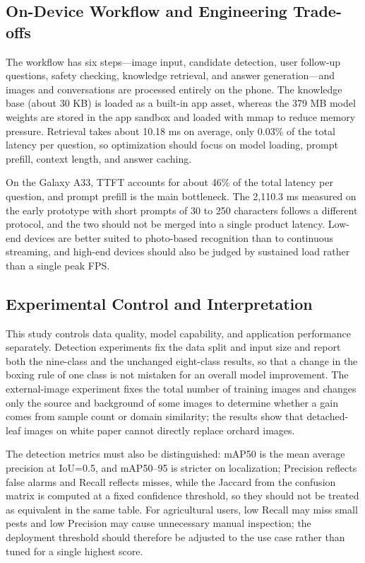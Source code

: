 \documentclass[10pt,twocolumn,a4paper]{article}
\begin{document}
\subsection{On-Device Workflow and Engineering Trade-offs}
The workflow has six steps—image input, candidate detection, user follow-up questions, safety checking, knowledge retrieval, and answer generation—and images and conversations are processed entirely on the phone. The knowledge base (about 30 KB) is loaded as a built-in app asset, whereas the 379 MB model weights are stored in the app sandbox and loaded with mmap to reduce memory pressure. Retrieval takes about 10.18 ms on average, only 0.03\% of the total latency per question, so optimization should focus on model loading, prompt prefill, context length, and answer caching.

On the Galaxy A33, TTFT accounts for about 46\% of the total latency per question, and prompt prefill is the main bottleneck. The 2,110.3 ms measured on the early prototype with short prompts of 30 to 250 characters follows a different protocol, and the two should not be merged into a single product latency. Low-end devices are better suited to photo-based recognition than to continuous streaming, and high-end devices should also be judged by sustained load rather than a single peak FPS.

\subsection{Experimental Control and Interpretation}
This study controls data quality, model capability, and application performance separately. Detection experiments fix the data split and input size and report both the nine-class and the unchanged eight-class results, so that a change in the boxing rule of one class is not mistaken for an overall model improvement. The external-image experiment fixes the total number of training images and changes only the source and background of some images to determine whether a gain comes from sample count or domain similarity; the results show that detached-leaf images on white paper cannot directly replace orchard images.

The detection metrics must also be distinguished: mAP50 is the mean average precision at IoU=0.5, and mAP50–95 is stricter on localization; Precision reflects false alarms and Recall reflects misses, while the Jaccard from the confusion matrix is computed at a fixed confidence threshold, so they should not be treated as equivalent in the same table. For agricultural users, low Recall may miss small pests and low Precision may cause unnecessary manual inspection; the deployment threshold should therefore be adjusted to the use case rather than tuned for a single highest score.
\end{document}
